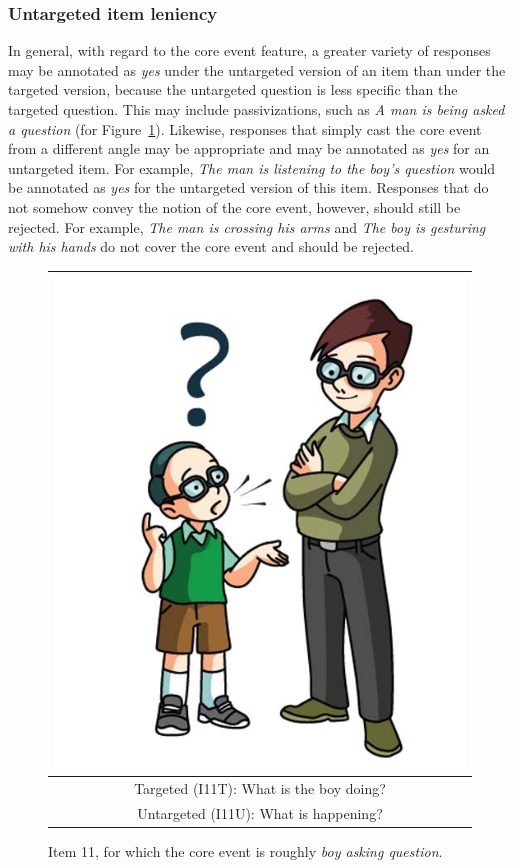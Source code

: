 \documentclass[12pt,notitlepage]{article}
\begin{document}
\subsubsection{Untargeted item leniency} In general, with regard to the core event feature, a greater variety of responses may be annotated as \textit{yes} under the untargeted version of an item than under the targeted version, because the untargeted question is less specific than the targeted question. This may include passivizations, such as \textit{A man is being asked a question} (for Figure~\ref{fig:ask-question}). Likewise, responses that simply cast the core event from a different angle may be appropriate and may be annotated as \textit{yes} for an untargeted item. For example, \textit{The man is listening to the boy's question} would be annotated as \textit{yes} for the untargeted version of this item. Responses that do not somehow convey the notion of the core event, however, should still be rejected. For example, \textit{The man is crossing his arms} and \textit{The boy is gesturing with his hands} do not cover the core event and should be rejected.

\begin{figure}[h]
\begin{center}
\begin{tabular}{|c|}
\hline
\includegraphics[width=0.4\columnwidth,trim=0 0 0 -3]{../figures/I11.jpg}\\
\hline
Targeted (I11T): What is the boy doing?\\
\hline
Untargeted (I11U): What is happening? \\
\hline
\end{tabular}
\end{center}
\caption{Item 11, for which the core event is roughly \textit{boy asking question}.}
\label{fig:ask-question}
\end{figure}
\end{document}

